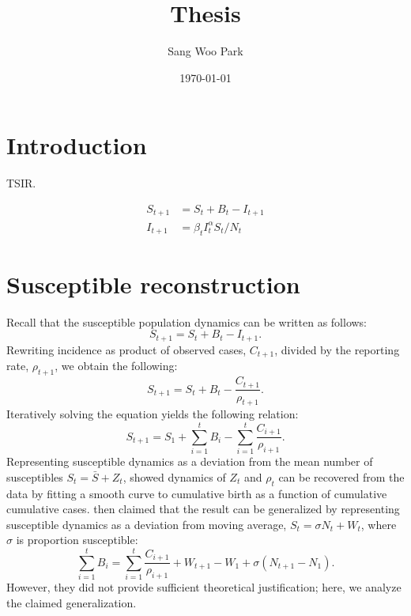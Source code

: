 \documentclass{article}
\title{Thesis}
\date{\today}
\author{Sang Woo Park}
\begin{document}
\maketitle

\section{Introduction}

TSIR.

\begin{equation}
\begin{aligned}
S_{t+1} &= S_t + B_t - I_{t+1}\\
I_{t+1} &= \beta_t I_{t}^\alpha S_t/N_t
\end{aligned}
\end{equation}

\section{Susceptible reconstruction}

Recall that the susceptible population dynamics can be written as follows:
\begin{equation}
S_{t+1} = S_{t} + B_t - I_{t+1}.
\end{equation}
Rewriting incidence as product of observed cases, $C_{t+1}$, divided by the reporting rate, $\rho_{t+1}$, we obtain the following:
\begin{equation}
S_{t+1} = S_t + B_t - \frac{C_{t+1}}{\rho_{t+1}}.
\end{equation}
Iteratively solving the equation yields the following relation:
\begin{equation}
S_{t+1} =  S_1 + \sum_{i=1}^t B_i - \sum_{i=1}^t \frac{C_{i+1}}{\rho_{i+1}}.
\label{eq:sus}
\end{equation}
Representing susceptible dynamics as a deviation from the mean number of susceptibles $S_t = \bar{S} + Z_t$, \cite{finkenstadt2000time} showed dynamics of $Z_t$ and $\rho_t$ can be recovered from the data by fitting a smooth curve to cumulative birth as a function of cumulative cumulative cases. 
\cite{dalziel2016persistent} then claimed that the result can be generalized by representing susceptible dynamics as a deviation from moving average, $S_t = \sigma N_t + W_t$, where $\sigma$ is proportion susceptible:
\begin{equation}
\sum_{i=1}^t B_i = \sum_{i=1}^t \frac{C_{i+1}}{\rho_{i+1}} + W_{t+1} - W_1 + \sigma (N_{t+1} - N_1).
\label{eq:gensus}
\end{equation}
However, they did not provide sufficient theoretical justification; here, we analyze the claimed generalization.
\end{document}
